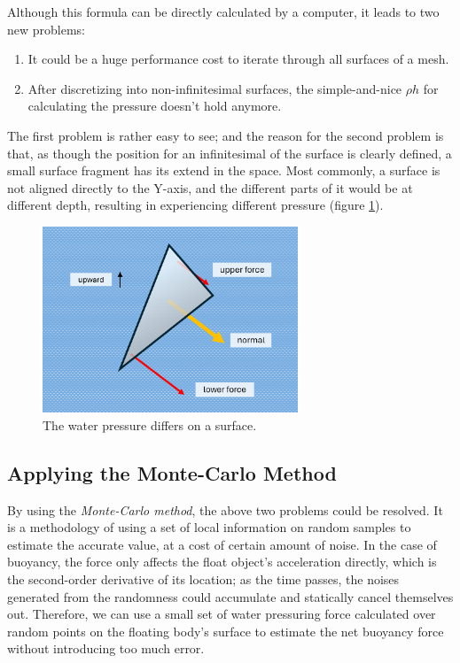Although this formula can be directly calculated by a computer, it leads to two new problems:
\begin{enumerate}
	\item It could be a huge performance cost to iterate through all surfaces of a mesh.
	\item After discretizing into non-infinitesimal surfaces, the simple-and-nice $\rho h$ for calculating the pressure doesn't hold anymore.
\end{enumerate}

The first problem is rather easy to see;
and the reason for the second problem is that, as though the position for an infinitesimal of the surface is clearly defined, a small surface fragment has its extend in the space.
Most commonly, a surface is not aligned directly to the Y-axis, and the different parts of it would be at different depth, resulting in experiencing different pressure (figure \ref{water-pressure-differs-on-surface}).

\begin{figure}[h]
	\begin{center}
		\includegraphics[width=3in]{figures/water-pressure-on-small-surface.png}
	\end{center}
	\caption{The water pressure differs on a surface.}
	\label{water-pressure-differs-on-surface}
\end{figure}

\subsection{Applying the Monte-Carlo Method}

By using the \emph{Monte-Carlo method}, the above two problems could be resolved.
It is a methodology of using a set of local information on random samples to estimate the accurate value, at a cost of certain amount of noise.
In the case of buoyancy, the force only affects the float object's acceleration directly, which is the second-order derivative of its location;
as the time passes, the noises generated from the randomness could accumulate and statically cancel themselves out.
Therefore, we can use a small set of water pressuring force calculated over random points on the floating body's surface to estimate the net buoyancy force without introducing too much error.


